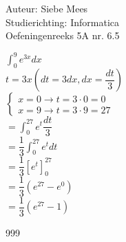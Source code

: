 \documentclass[a4paper]{article}
\begin{document}
  
\noindent \large Auteur: Siebe Mees \\
\noindent \large Studierichting: Informatica\\
\noindent \large Oefeningenreeks 5A nr. 6.5\\

\medskip

\normalsize

$ \displaystyle\int_{0}^{9} e^{3x} dx $\\

$ t = 3x \left(dt = 3dx, dx = \dfrac{dt}{3} \right)$\\

$ \left \{
\begin{array}{l}
x = 0 \rightarrow t = 3 \cdot 0 = 0 \\
x = 9 \rightarrow t = 3 \cdot 9 = 27
\end{array}
\right . $\\

$ = \displaystyle\int_{0}^{27} e^t \dfrac{dt}{3} $\\

$ = \dfrac{1}{3}\displaystyle\int_{0}^{27} e^t dt $\\

$ = \dfrac{1}{3}\left[ e^t \right]_{0}^{27} $\\

$ = \dfrac{1}{3}\left( e^{27} - e^0 \right) $\\

$ = \dfrac{1}{3}\left( e^{27} - 1 \right) $\\

\begin{thebibliography}{999}
\end{thebibliography}
\end{document}
